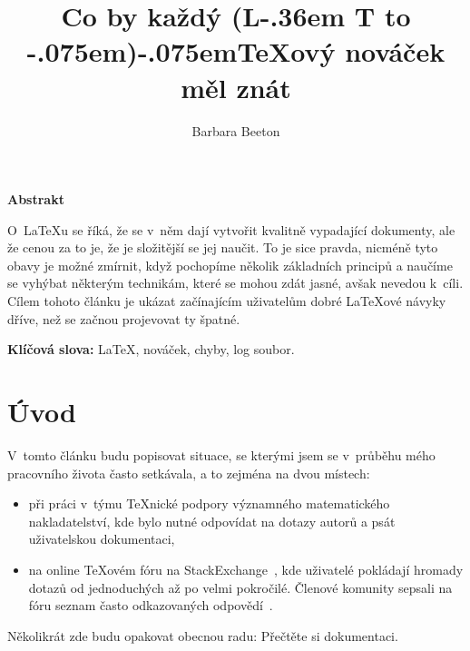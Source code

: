 \documentclass[oldcsbabel]{csbulletin}
\makeatletter
\DeclareRobustCommand{\La}{L\kern-.36em%
        {\sbox\z@ T%
         \vbox to\ht\z@{\hbox{\check@mathfonts
                              \fontsize\sf@size\z@
                              \math@fontsfalse\selectfont
                              A}%
                        \vss}%
        }}
\def\AllTeX{(\La\kern-.075em)\kern-.075em\TeX}
\makeatother
\begin{document}
\title
  {Co by každý \AllTeX ový nováček měl znát}
\author{Barbara Beeton}

\maketitle[3pt]

\begin{narrower}

{\hfil\bf Abstrakt}\medskip

O~\LaTeX u se říká, že se v~něm dají vytvořit kvalitně vypadající dokumenty,
ale že cenou za to je, že je složitější se jej naučit.
To je sice pravda, nicméně tyto obavy je možné zmírnit, když pochopíme několik základních principů a naučíme se vyhýbat některým technikám, které se mohou zdát jasné, avšak nevedou k~cíli. Cílem tohoto článku je ukázat začínajícím uživatelům dobré \LaTeX ové návyky dříve, než se začnou projevovat ty špatné.

\medskip\noindent
{\bf Klíčová slova:}
\LaTeX, nováček, chyby, log soubor.

\end{narrower}

\makeatletter
\def\@thefnmark{}
\makeatother

\section{Úvod}

V~tomto článku budu popisovat situace, se kterými jsem se v~průběhu mého pracovního života často setkávala, a to zejména na dvou místech:
\begin{itemize}
\item při práci v~týmu \TeX nické podpory významného matematického nakladatelství, kde bylo nutné odpovídat na dotazy autorů a psát uživatelskou dokumentaci,
\item na online \TeX ovém fóru na StackExchange~\cite{TSE}, kde uživatelé pokládají hromady dotazů od jednoduchých až po velmi pokročilé. Členové komunity sepsali na fóru seznam často odkazovaných odpovědí~\cite{2419}.
\end{itemize}
Několikrát zde budu opakovat obecnou radu: Přečtěte si dokumentaci.
\end{document}
